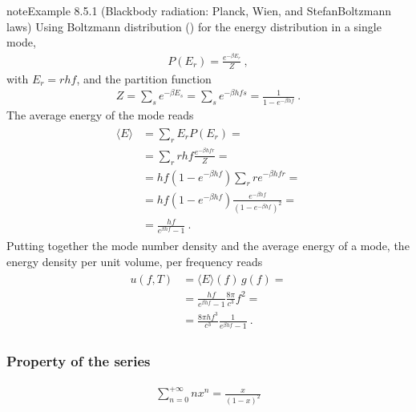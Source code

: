 \documentclass[letterpaper,10pt,english]{jupyterBook}
\begin{document}
\begin{sphinxadmonition}{note}{Example 8.5.1 (Black\sphinxhyphen{}body radiation: Planck, Wien, and Stefan\sphinxhyphen{}Boltzmann laws)}
\sphinxAtStartPar
Using Boltzmann distribution () for the energy distribution in a single mode,
\begin{equation*}
\begin{split}P(E_r) = \frac{e^{-\beta E_r}}{Z} \ ,\end{split}
\end{equation*}
\sphinxAtStartPar
with \(E_r = r h f\), and the partition function
\begin{equation*}
\begin{split}Z = \sum_{s} e^{- \beta E_s} = \sum_s e^{-\beta h f s} = \frac{1}{1 - e^{-\beta h f}} \ .\end{split}
\end{equation*}
\sphinxAtStartPar
The average energy of the mode reads
\begin{equation*}
\begin{split}\begin{aligned}
  \langle E \rangle
  & = \sum_r E_r P(E_r) = \\
  & = \sum_r r h f \frac{e^{- \beta h f r}}{Z} = \\
  & = h f (1-e^{-\beta h f}) \sum_r r e^{- \beta h f r} = \\
  & = h f (1-e^{-\beta h f}) \frac{e^{- \beta h f}}{(1-e^{-\beta h f})^2} = \\
  & = \frac{h f}{e^{\beta h f} - 1}  \ .
\end{aligned}\end{split}
\end{equation*}
\sphinxAtStartPar
Putting together the mode number density and the average energy of a mode, the energy density per unit volume, per frequency reads
\begin{equation*}
\begin{split}\begin{aligned}
  u(f, T)
  & = \langle E \rangle(f) \, g(f) = \\
  & = \frac{hf}{e^{\beta h f} - 1} \frac{8 \pi}{c^3} f^2 = \\
  & = \frac{8 \pi h f^3}{c^3} \frac{1}{e^{\beta h f} - 1} \ .
\end{aligned}\end{split}
\end{equation*}\subsubsection*{Property of the series}
\begin{equation*}
\begin{split}\sum_{n=0}^{+\infty} n x^n = \frac{x}{(1-x)^2}\end{split}

\end{equation*}
\end{sphinxadmonition}
\end{document}
